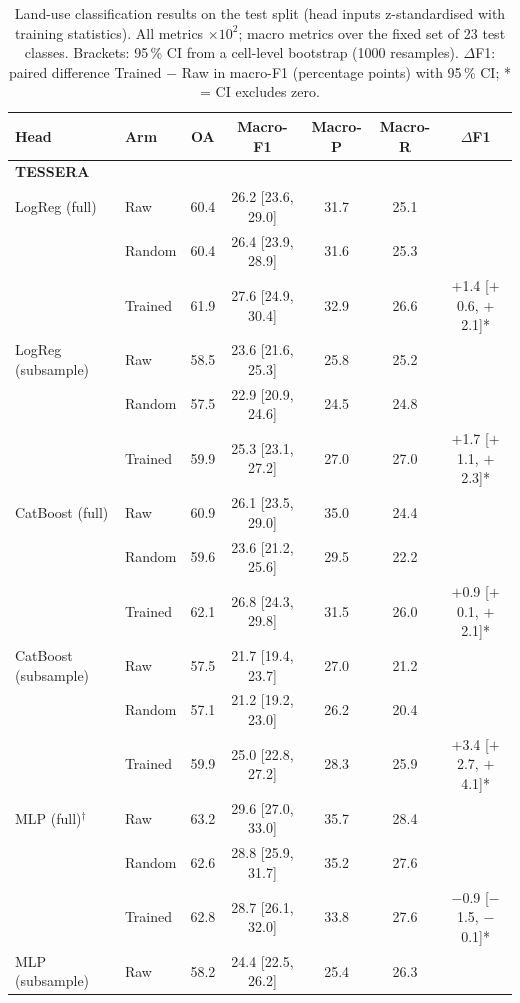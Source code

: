 \begin{table}[H]
  \centering
  \small
  \caption{Land-use classification results on the test split (head inputs z-standardised with training statistics). All metrics $\times 10^{2}$; macro metrics over the fixed set of 23 test classes. Brackets: 95\,\% CI from a cell-level bootstrap (1000 resamples). $\Delta$F1: paired difference Trained $-$ Raw in macro-F1 (percentage points) with 95\,\% CI; * = CI excludes zero.}
  \label{tab:luc_results}
  \begin{tabular}{llccccc}
    \toprule
    Head & Arm & OA & Macro-F1 & Macro-P & Macro-R & $\Delta$F1 \\
    \midrule
    \multicolumn{7}{l}{\textbf{TESSERA}} \\
    \midrule
    LogReg (full) & Raw & 60.4 & 26.2 [23.6, 29.0] & 31.7 & 25.1 &  \\
     & Random & 60.4 & 26.4 [23.9, 28.9] & 31.6 & 25.3 &  \\
     & Trained & 61.9 & 27.6 [24.9, 30.4] & 32.9 & 26.6 & $+$1.4 [$+$0.6, $+$2.1]* \\
    \addlinespace
    LogReg (subsample) & Raw & 58.5 & 23.6 [21.6, 25.3] & 25.8 & 25.2 &  \\
     & Random & 57.5 & 22.9 [20.9, 24.6] & 24.5 & 24.8 &  \\
     & Trained & 59.9 & 25.3 [23.1, 27.2] & 27.0 & 27.0 & $+$1.7 [$+$1.1, $+$2.3]* \\
    \addlinespace
    CatBoost (full) & Raw & 60.9 & 26.1 [23.5, 29.0] & 35.0 & 24.4 &  \\
     & Random & 59.6 & 23.6 [21.2, 25.6] & 29.5 & 22.2 &  \\
     & Trained & 62.1 & 26.8 [24.3, 29.8] & 31.5 & 26.0 & $+$0.9 [$+$0.1, $+$2.1]* \\
    \addlinespace
    CatBoost (subsample) & Raw & 57.5 & 21.7 [19.4, 23.7] & 27.0 & 21.2 &  \\
     & Random & 57.1 & 21.2 [19.2, 23.0] & 26.2 & 20.4 &  \\
     & Trained & 59.9 & 25.0 [22.8, 27.2] & 28.3 & 25.9 & $+$3.4 [$+$2.7, $+$4.1]* \\
    \addlinespace
    MLP (full)$^\dagger$ & Raw & 63.2 & 29.6 [27.0, 33.0] & 35.7 & 28.4 &  \\
     & Random & 62.6 & 28.8 [25.9, 31.7] & 35.2 & 27.6 &  \\
     & Trained & 62.8 & 28.7 [26.1, 32.0] & 33.8 & 27.6 & $-$0.9 [$-$1.5, $-$0.1]* \\
    \addlinespace
    MLP (subsample) & Raw & 58.2 & 24.4 [22.5, 26.2] & 25.4 & 26.3 &  \\

\end{tabular}
\end{table}
